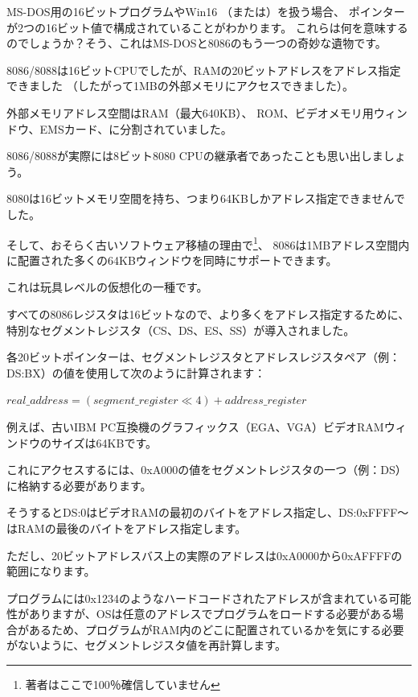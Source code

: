 \label{8086_memory_model}

MS-DOS用の16ビットプログラムやWin16
（または）を扱う場合、
ポインターが2つの16ビット値で構成されていることがわかります。
これらは何を意味するのでしょうか？そう、これはMS-DOSと8086のもう一つの奇妙な遺物です。

8086/8088は16ビットCPUでしたが、RAMの20ビットアドレスをアドレス指定できました
（したがって1MBの外部メモリにアクセスできました）。

外部メモリアドレス空間は\ac{RAM}（最大640KB）、
\ac{ROM}、ビデオメモリ用ウィンドウ、EMSカード、\etc{}に分割されていました。

8086/8088が実際には8ビット8080 CPUの継承者であったことも思い出しましょう。

8080は16ビットメモリ空間を持ち、つまり64KBしかアドレス指定できませんでした。

そして、おそらく古いソフトウェア移植の理由で\footnote{著者はここで100％確信していません}、
8086は1MBアドレス空間内に配置された多くの64KBウィンドウを同時にサポートできます。

これは玩具レベルの仮想化の一種です。

すべての8086レジスタは16ビットなので、より多くをアドレス指定するために、特別なセグメントレジスタ（CS、DS、ES、SS）が導入されました。

各20ビットポインターは、セグメントレジスタとアドレスレジスタペア（例：DS:BX）の値を使用して次のように計算されます：

\begin{center}
$real\_address = (segment\_register \ll 4) + address\_register$
\end{center}

例えば、古いIBM PC互換機のグラフィックス（\ac{EGA}、\ac{VGA}）ビデオ\ac{RAM}ウィンドウのサイズは64KBです。

これにアクセスするには、0xA000の値をセグメントレジスタの一つ（例：DS）に格納する必要があります。

そうするとDS:0はビデオ\ac{RAM}の最初のバイトをアドレス指定し、DS:0xFFFF〜はRAMの最後のバイトをアドレス指定します。

ただし、20ビットアドレスバス上の実際のアドレスは0xA0000から0xAFFFFの範囲になります。

プログラムには0x1234のようなハードコードされたアドレスが含まれている可能性がありますが、\ac{OS}は任意のアドレスでプログラムをロードする必要がある場合があるため、プログラムがRAM内のどこに配置されているかを気にする必要がないように、セグメントレジスタ値を再計算します。

